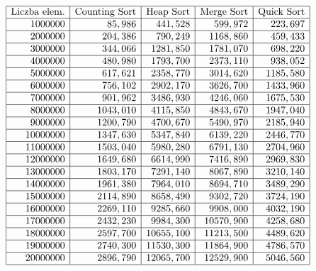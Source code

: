 \documentclass[polish,polish,a4paper]{article}
\begin{document}
\begin{spacing}{1.5}
\begin{figure}[H]
	\begin{equation*}
	\begin{array}{|r|r|r|r|r|}
	\hline
	\multicolumn{1}{|c|}{$Liczba elem.$}&\multicolumn{1}{c|}{$Counting Sort$}&\multicolumn{1}{c|}{$Heap Sort$}&\multicolumn{1}{c|}{$Merge Sort$}&\multicolumn{1}{c|}{$Quick Sort$}\\\hline
	1000000&	85,986& 441,528& 599,972&	223,697\\\hline
	2000000& 204,386&	790,249&	1168,860&	459,433\\\hline
	3000000&	344,066&	1281,850&	1781,070&	698,220\\\hline
	4000000& 480,980&	1793,700&	2373,110&	938,052\\\hline
	5000000& 617,621&	2358,770&	3014,620&	1185,580\\\hline
	6000000& 756,102&	2902,170&	3626,700&	1433,960\\\hline
	7000000& 901,962&	3486,930&	4246,060&	1675,530\\\hline
	8000000& 1043,010&	4115,850&	4843,670&	1947,040\\\hline
	9000000& 1200,790&	4700,670&	5490,970&	2185,940\\\hline
	10000000& 	1347,630&	5347,840&	6139,220&	2446,770\\\hline
	11000000& 	1503,040&	5980,280&	6791,130&	2704,960\\\hline
	12000000& 	1649,680&	6614,990&	7416,890&	2969,830\\\hline
	13000000& 	1803,170&	7291,140&	8067,890&	3210,140\\\hline
	14000000& 	1961,380&	7964,010&	8694,710&	3489,290\\\hline
	15000000& 	2114,890&	8658,490&	9302,720&	3724,190\\\hline
	16000000& 	2269,110&	9285,660&	9908,000&	4032,190\\\hline
	17000000& 	2432,230&	9984,300&	10570,900&	4258,680\\\hline
	18000000& 	2597,700&	10655,100&	11213,500&	4489,620\\\hline
	19000000& 	2740,300&	11530,300&	11864,900&	4786,570\\\hline
	20000000& 	2896,790&	12065,700&	12529,900&	5046,560\\
	\hline

	\end{array}
	\end{equation*}
\end{figure}


\end{spacing}
\end{document}
